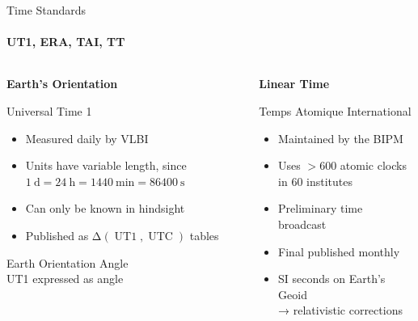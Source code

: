 \documentclass[aspectratio=1610, 9pt]{beamer}
\begin{document}
\begin{frame}{Time Standards}
  \framesubtitle{UT1, ERA, TAI, TT}
  \begin{columns}[t, onlytextwidth]
    \begin{column}{0.495\textwidth}
      \begin{center}
        \textbf{\Large Earth's Orientation}\\[0.5\baselineskip]%

        \begin{description}
          \item[UT1] Universal Time 1
            \begin{itemize}
              \item Measured daily by VLBI
              \item Units have variable length, since $\SI{1}{\day} = \SI{24}{\hour} = \SI{1440}{\minute} = \SI{86400}{\second}$
              \item Can only be known in hindsight
              \item Published as $\increment(\operatorname{UT1}, \operatorname{UTC})$ tables
            \end{itemize}
          \item[ERA ($\theta$)] Earth Orientation Angle \\
            UT1 expressed as angle
        \end{description}
      \end{center}
    \end{column}
    \begin{column}{0.495\textwidth}
      \begin{center}
        \textbf{\Large Linear Time}\\[0.5\baselineskip]%
        \begin{description}[TAI]
          \item[TAI] Temps Atomique International
            \begin{itemize}
              \item Maintained by the BIPM
              \item Uses $>600$ atomic clocks in 60 institutes
              \item Preliminary \TAI{} time broadcast
              \item Final \TAI{} published monthly
              \item SI seconds on Earth's Geoid\\ → relativistic corrections
            \end{itemize}

\end{description}
\end{center}
\end{column}
\end{columns}
\end{frame}
\end{document}
